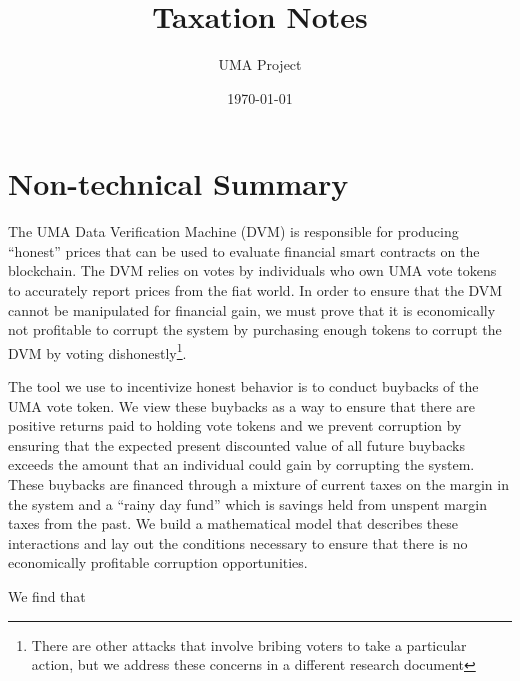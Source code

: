 \documentclass[12pt]{article}
\title{Taxation Notes}
\author{UMA Project}
\date{\today}
\begin{document}
\maketitle

\clearpage
\newpage


\section{Non-technical Summary}

  The UMA Data Verification Machine (DVM) is responsible for producing ``honest'' prices that can be
  used to evaluate financial smart contracts on the blockchain. The DVM relies on votes by
  individuals who own UMA vote tokens to accurately report prices from the fiat world. In order to
  ensure that the DVM cannot be manipulated for financial gain, we must prove that it is
  economically not profitable to corrupt the system by purchasing enough tokens to corrupt the DVM
  by voting dishonestly\footnote{There are other attacks that involve bribing voters to take a
  particular action, but we address these concerns in a different research document}.

  The tool we use to incentivize honest behavior is to conduct buybacks of the UMA vote token.  We
  view these buybacks as a way to ensure that there are positive returns paid to holding vote tokens
  and we prevent corruption by ensuring that the expected present discounted value of all future
  buybacks exceeds the amount that an individual could gain by corrupting the system. These buybacks
  are financed through a mixture of current taxes on the margin in the system and a ``rainy day
  fund'' which is savings held from unspent margin taxes from the past. We build a mathematical
  model that describes these interactions and lay out the conditions necessary to ensure that there
  is no economically profitable corruption opportunities.

  We find that
\end{document}
